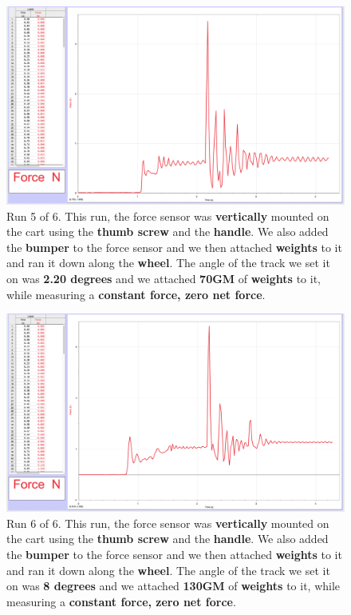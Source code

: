 \documentclass[idxtotoc,hyperref,openany]{labbook} %
\begin{document}
\begin{figure}[H] %
\begin{center}
\includegraphics[width=.80\linewidth]{images/Lab.05/Lab05.Run5.png}
\end{center}
\caption{Run 5 of 6. This run, the force sensor was \textbf{vertically} mounted on the cart using the \textbf{thumb screw} and the \textbf{handle}. We also added the \textbf{bumper} to the force sensor and we then attached \textbf{weights} to it and ran it down along the \textbf{wheel}. The angle of the track we set it on was \textbf{2.20 degrees} and we attached \textbf{70GM} of \textbf{weights} to it, while measuring a \textbf{constant force, zero net force}.}
\label{fig:Lab05-Run5}
\end{figure}

\begin{figure}[H] %
\begin{center}
\includegraphics[width=.80\linewidth]{images/Lab.05/Lab05.Run6.png}
\end{center}
\caption{Run 6 of 6. This run, the force sensor was \textbf{vertically} mounted on the cart using the \textbf{thumb screw} and the \textbf{handle}. We also added the \textbf{bumper} to the force sensor and we then attached \textbf{weights} to it and ran it down along the \textbf{wheel}. The angle of the track we set it on was \textbf{8 degrees} and we attached \textbf{130GM} of \textbf{weights} to it, while measuring a \textbf{constant force, zero net force}.}
\label{fig:Lab05-Run6}
\end{figure}
\end{document}

